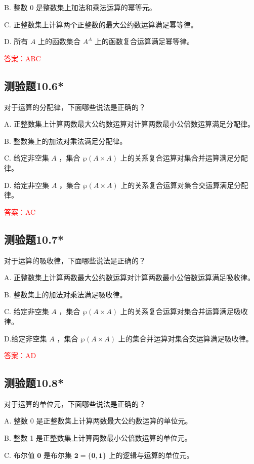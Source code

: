 \documentclass[UTF8, heading=true]{ctexart}
\begin{document}
B. 整数 0 是整数集上加法和乘法运算的幂等元。

C. 正整数集上计算两个正整数的最大公约数运算满足幂等律。

D. 所有 $A$ 上的函数集合 $A^A$ 上的函数复合运算满足幂等律。

\textcolor{red}{答案：ABC}

\subsection{测验题10.6*}

对于运算的分配律，下面哪些说法是正确的？

A. 正整数集上计算两数最大公约数运算对计算两数最小公倍数运算满足分配律。

B. 整数集上的加法对乘法满足分配律。

C. 给定非空集 $A$ ，集合 $\wp(A \times A)$ 上的关系复合运算对集合并运算满足分配律。

D. 给定非空集 $A$ ，集合 $\wp(A \times A)$ 上的关系复合运算对集合交运算满足分配律。

\textcolor{red}{答案：AC}

\subsection{测验题10.7*}

对于运算的吸收律，下面哪些说法是正确的？

A. 正整数集上计算两数最大公约数运算对计算两数最小公倍数运算满足吸收律。

B. 整数集上的加法对乘法满足吸收律。

C. 给定非空集 $A$ ，集合 $\wp(A \times A)$ 上的关系复合运算对集合并运算满足吸收律。

D.给定非空集 $A$ ，集合 $\wp(A \times A)$ 上的集合并运算对集合交运算满足吸收律。

\textcolor{red}{答案：AD}

\subsection{测验题10.8*}

对于运算的单位元，下面哪些说法是正确的？

A. 整数 0 是正整数集上计算两数最大公约数运算的单位元。

B. 整数 1 是正整数集上计算两数最小公倍数运算的单位元。

C. 布尔值 $\mathbf{0}$ 是布尔集 $\mathbf{2}=\{\mathbf{0}, \mathbf{1}\}$ 上的逻辑与运算的单位元。
\end{document}
